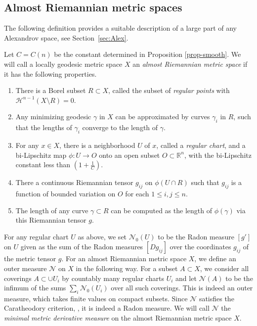 \documentclass[12pt,leqno,intlimits]{amsart}
\numberwithin{equation}{section}
\theoremstyle{definition}
\theoremstyle{remark}
\newcommand{\R}{\mathbb{R}}
\def\:{\colon}
\begin{document}

\subsection{Almost Riemannian metric spaces}
The following definition provides a suitable description of a large part of any Alexandrov space, see Section~\ref{sec:Alex}.

Let $C =C(n)$ be the constant determined in Proposition \ref{prop-smooth}. We will call a locally geodesic metric space
$X$ an \emph{almost Riemannian metric space} if it has the following properties.
\begin{enumerate}
\item There is a Borel subset $R\subset X$, called the subset of \emph{regular points} with $\mathcal H^{n-1} (X\setminus R)=0$.
\item Any minimizing geodesic $\gamma$ in $X$ can be approximated by curves $\gamma _i$ in $R$, such that the lengths of $\gamma _i$ converge to the length of $\gamma$.
\item For any $x\in X$, there is a neighborhood $U$ of $x$, called a \emph{regular chart}, and a bi-Lipschitz map
$\phi\:U\to O$ onto an open subset $O\subset \R^n$, with the bi-Lipschitz constant less than $(1+\frac 1 C)$.
\item There a continuous Riemannian tensor $g_{ij} $ on $\phi (U\cap R)$ such that $g_{ij}$ is a function of bounded variation on $O$
for each $1\leq i,j \leq n$.
\item The length of any curve $\gamma \subset R$ can be computed as the length of $\phi (\gamma )$ via this Riemannian tensor $g$.
\end{enumerate}

For any regular chart $U$ as above, we set $\mathcal N_0 (U)$ to be the Radon measure $[g']$ on $U$ given as the sum of
the Radon measures $[D g_{ij}]$ over the coordinates $ g_{ij}$ of the metric tensor $g$.
For an almost Riemannian metric space $X$, we define an outer measure $\mathcal N$ on $X$ in the following way.
For a subset $A\subset X$, we consider all coverings $A\subset \cup U_i$ by countably many regular charts $U_i$ and let $\mathcal N(A)$
to be the infimum of the sums $\sum_i \mathcal N_0 (U_i)$ over all such coverings. This is indeed an outer measure, which takes finite values on compact subsets. Since $\mathcal N$ satisfies the Caratheodory criterion, \cite[Theorem 1.9]{Evans}, it is indeed a Radon measure. We will call $\mathcal N$ the \emph{minimal metric derivative measure} on the almost Riemannian metric space $X$.
\end{document}
